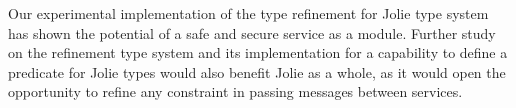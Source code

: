 Our experimental implementation of the type refinement for Jolie type system has shown the potential of a safe and secure service as a module. Further study on the refinement type system and its implementation for a capability to define a predicate for Jolie types would also benefit Jolie as a whole, as it would open the opportunity to refine any constraint in passing messages between services.
